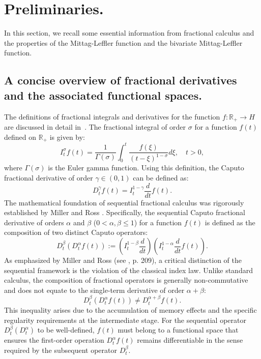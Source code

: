\documentclass{amsart}
\numberwithin{equation}{section}
\begin{document}
\section{Preliminaries.}\label{jumaeva:sec:2}
In this section, we recall some essential information from fractional calculus and the properties of the Mittag-Leffler function and the bivariate Mittag-Leffler function.

\subsection{A concise overview of fractional derivatives and the associated functional spaces.}
The definitions of fractional integrals and derivatives for the function $f:\mathbb{R}_+ \rightarrow H$ are discussed in detail in~\cite{jumaeva:ref:21}. The fractional integral of order $\sigma$ for a function $f(t)$ defined on $\mathbb{R}_+$ is given by:
\begin{equation*}
I_t^\sigma f(t)=\frac{1}{\Gamma(\sigma)} \int_0^t \frac{f(\xi)}{(t-\xi)^{1-\sigma}} d\xi, \quad t>0,
\end{equation*}
where $\Gamma(\sigma)$ is the Euler gamma function. Using this definition, the Caputo fractional derivative of order $\gamma \in (0,1)$ can be defined as:
\begin{equation*}
D_t^\gamma f(t)=I_t^{1-\gamma} \frac{d}{dt}f(t).
\end{equation*}
The mathematical foundation of sequential fractional calculus was rigorously established by Miller and Ross \cite{jumaeva:ref:4}. Specifically, the sequential Caputo fractional derivative of orders $\alpha$ and $\beta$ ($0 < \alpha, \beta \leq 1$) for a function $f(t)$ is defined as the composition of two distinct Caputo operators:
\begin{equation*}
D_{t}^{\beta} \left( D_{t}^{\alpha} f(t) \right) := \left( I_{t}^{1-\beta} \frac{d}{dt} \right) \left( I_{t}^{1-\alpha} \frac{d}{dt} f(t) \right).
\end{equation*}
As emphasized by Miller and Ross (see \cite{jumaeva:ref:4}, p. 209), a critical distinction of the sequential framework is the violation of the classical index law. Unlike standard calculus, the composition of fractional operators is generally non-commutative and does not equate to the single-term derivative of order $\alpha + \beta$:
\begin{equation*}
D_{t}^{\beta} (D_{t}^{\alpha} f(t)) \neq D_{t}^{\alpha+\beta} f(t).
\end{equation*}
This inequality arises due to the accumulation of memory effects and the specific regularity requirements at the intermediate stage. For the sequential operator $D_t^{\beta}(D_t^{\alpha})$ to be well-defined, $f(t)$ must belong to a functional space that ensures the first-order operation $D_t^{\alpha}f(t)$ remains differentiable in the sense required by the subsequent operator $D_t^{\beta}$. 
\end{document}
